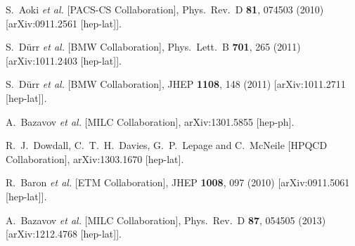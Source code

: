 \begin{thebibliography}{99}
  S.~Aoki {\it et al.}  [PACS-CS Collaboration],
  Phys.\ Rev.\ D {\bf 81}, 074503 (2010)
  [arXiv:0911.2561 [hep-lat]].
  
  S.~D{\"u}rr {\it et al.} [BMW Collaboration],
  Phys.\ Lett.\ B {\bf 701}, 265 (2011)
  [arXiv:1011.2403 [hep-lat]].
  
  S.~D{\"u}rr {\it et al.} [BMW Collaboration],
  JHEP {\bf 1108}, 148 (2011)
  [arXiv:1011.2711 [hep-lat]].
  
  A.~Bazavov {\it et al.} [MILC Collaboration],
  arXiv:1301.5855 [hep-ph].
  
  R.~J.~Dowdall, C.~T.~H.~Davies, G.~P.~Lepage and C.~McNeile [HPQCD Collaboration],
  arXiv:1303.1670 [hep-lat].
  
  R.~Baron {\it et al.}  [ETM Collaboration],
  JHEP {\bf 1008}, 097 (2010)
  [arXiv:0911.5061 [hep-lat]].
  
  A.~Bazavov {\it et al.}  [MILC Collaboration],
  Phys.\ Rev.\ D {\bf 87}, 054505 (2013)
  [arXiv:1212.4768 [hep-lat]].
  
\end{thebibliography}




